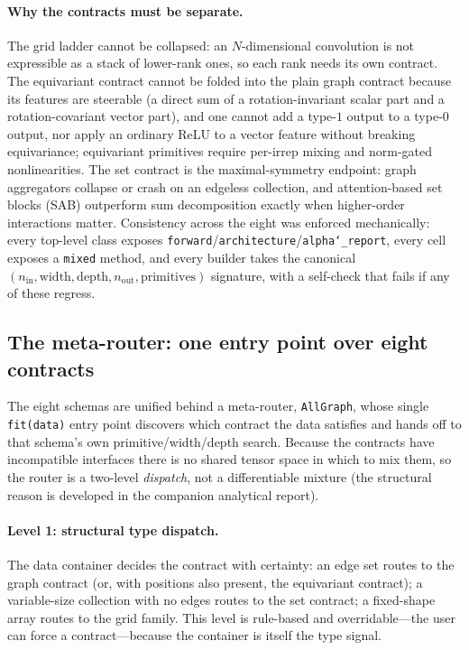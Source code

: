 \documentclass[11pt]{article}
\newcommand{\allowbreakhere}{\discretionary{}{}{}}
\newcommand{\code}[1]{\texttt{\def\_{\char`_\allowbreakhere}#1}}
\begin{document}
\paragraph{Why the contracts must be separate.} The grid ladder cannot be collapsed: an
$N$-dimensional convolution is not expressible as a stack of lower-rank ones, so each rank needs its
own contract. The equivariant contract cannot be folded into the plain graph contract because its
features are steerable (a direct sum of a rotation-invariant scalar part and a rotation-covariant
vector part), and one cannot add a type-$1$ output to a type-$0$ output, nor apply an ordinary ReLU to
a vector feature without breaking equivariance; equivariant primitives require per-irrep mixing and
norm-gated nonlinearities. The set contract is the maximal-symmetry endpoint: graph aggregators
collapse or crash on an edgeless collection, and attention-based set blocks (SAB) outperform sum
decomposition exactly when higher-order interactions matter. Consistency across the eight was enforced
mechanically: every top-level class exposes \code{forward}/\code{architecture}/\code{alpha\_report},
every cell exposes a \code{mixed} method, and every builder takes the canonical
$(n_{\mathrm{in}},\text{width},\text{depth},n_{\mathrm{out}},\text{primitives})$ signature, with a
self-check that fails if any of these regress.

\subsection{The meta-router: one entry point over eight contracts}
\label{sec:metarouter-impl}

The eight schemas are unified behind a meta-router, \code{AllGraph}, whose single
\code{fit(data)} entry point discovers which contract the data satisfies and hands off to that
schema's own primitive/width/depth search. Because the contracts have incompatible interfaces
there is no shared tensor space in which to mix them, so the router is a two-level \emph{dispatch},
not a differentiable mixture (the structural reason is developed in the companion analytical report).

\paragraph{Level 1: structural type dispatch.} The data container decides the contract with certainty:
an edge set routes to the graph contract (or, with positions also present, the equivariant contract);
a variable-size collection with no edges routes to the set contract; a fixed-shape array routes to the
grid family. This level is rule-based and overridable---the user can force a contract---because the
container is itself the type signal.
\end{document}
